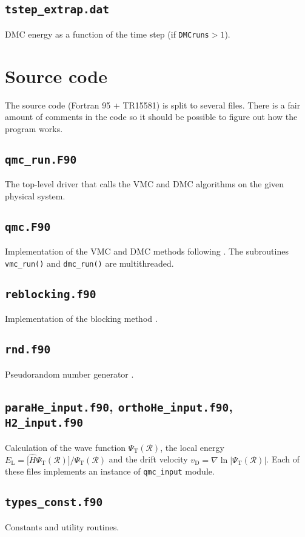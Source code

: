 \documentclass[12pt,a4paper,twoside]{article}
\def\code#1{{\lstinline$#1$}}
\begin{document}
\subsection{\code{tstep_extrap.dat}}

DMC energy as a function of the time step (if \code{DMCruns}${}>1$).



\section{Source code}

The source code (Fortran 95 + TR15581) is split to several files. There is a fair
amount of comments in the code so it should be possible to figure out
how the program works.

\subsection{\code{qmc_run.F90}}

The top-level driver that calls the VMC and DMC algorithms on the
given physical system.

\subsection{\code{qmc.F90}}

Implementation of the VMC and DMC methods following
\cite{reynolds1982}. The subroutines
\code{vmc_run()} and \code{dmc_run()} are multithreaded.

\subsection{\code{reblocking.f90}}

Implementation of the blocking method \cite{flyvbjerg1989}.

\subsection{\code{rnd.f90}}

Pseudorandom number generator \cite{NRf90}.

\subsection{\code{paraHe_input.f90}, \code{orthoHe_input.f90},
  \code{H2_input.f90}}
\label{sec:qmc_input}

Calculation of the wave function $\Psi_\text{T}(\mathcal R)$, the local
energy $E_\text{L}=\bigl[\hat H \Psi_\text{T}(\mathcal
R)\bigr]/\Psi_\text{T}(\mathcal R)$ and the drift velocity
$v_\text{D}=\nabla\ln |\Psi_\text{T}(\mathcal R)|$. Each of these
files implements an instance of \code{qmc_input} module.

\subsection{\code{types_const.f90}}

Constants and utility routines.


\end{document}

